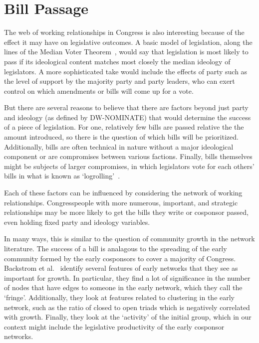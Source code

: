 \section{Bill Passage}

The web of working relationships in Congress is also interesting because of the
effect it may have on legislative outcomes. A basic model of legislation, along
the lines of the Median Voter Theorem~\cite{Black}, would say that legislation
is most likely to pass if its ideological content matches most closely the
median ideology of legislators. A more sophisticated take would include the
effects of party such as the level of support by the majority party and party
leaders, who can exert control on which amendments or bills will come up for a
vote.

But there are several reasons to believe that there are factors beyond just
party and ideology (as defined by DW-NOMINATE) that would determine the success
of a piece of legislation. For one, relatively few bills are passed relative the
the amount introduced, so there is the question of which bills will be
prioritized. Additionally, bills are often technical in nature without a major
ideological component or are compromises between various factions. Finally,
bills themselves might be subjects of larger compromises, in which legislators
vote for each others' bills in what is known as `logrolling'~\cite{Schwartz}.

Each of these factors can be influenced by considering the network of working
relationships. Congresspeople with more numerous, important, and strategic
relationships may be more likely to get the bills they write or cosponsor
passed, even holding fixed party and ideology variables.

In many ways, this is similar to the question of community growth in the network
literature. The success of a bill is analagous to the spreading of the early
community formed by the early cosponsors to cover a majority of Congress.
Backstrom et al.~\cite{Backstrom} identify several features of early networks
that they see as important for growth. In particular, they find a lot of
significance in the number of nodes that have edges to someone in the early
network, which they call the `fringe'. Additionally, they look at features
related to clustering in the early network, such as the ratio of closed to open
triads which is negatively correlated with growth. Finally, they look at the
`activity' of the initial group, which in our context might include the
legislative productivity of the early cosponsor networks.

